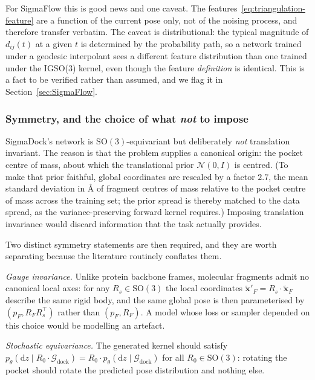 \documentclass[a4paper,12pt]{article}
\theoremstyle{remark}
\begin{document}
For SigmaFlow this is good news and one caveat. The features~\eqref{eq:triangulation-feature} are a
function of the current pose only, not of the noising process, and therefore transfer verbatim.
The caveat is distributional: the typical magnitude of $d_{ij}(t)$ at a given $t$ is determined by
the probability path, so a network trained under a geodesic interpolant sees a different feature
distribution than one trained under the IGSO(3) kernel, even though the feature \emph{definition}
is identical. This is a fact to be verified rather than assumed, and we flag it in
Section~\ref{sec:SigmaFlow}.

\subsubsection{Symmetry, and the choice of what \emph{not} to impose}

SigmaDock's network is $\mathrm{SO}(3)$-equivariant but deliberately \emph{not} translation
invariant. The reason is that the problem supplies a canonical origin: the pocket centre of mass,
about which the translational prior $\mathcal{N}(0, I)$ is centred. (To make that prior faithful,
global coordinates are rescaled by a factor $2.7$, the mean standard deviation in \AA{} of fragment
centres of mass relative to the pocket centre of mass across the training set; the prior spread is
thereby matched to the data spread, as the variance-preserving forward kernel requires.) Imposing
translation invariance would discard information that the task actually provides.

Two distinct symmetry statements are then required, and they are worth separating because the
literature routinely conflates them.

\emph{Gauge invariance.} Unlike protein backbone frames, molecular fragments admit no canonical
local axes: for any $R_s \in \mathrm{SO}(3)$ the local coordinates
$\tilde{\mathbf{x}}'_F = R_s \cdot \tilde{\mathbf{x}}_F$ describe the same rigid body, and the same
global pose is then parameterised by $(p_F, R_F R_s^{\top})$ rather than $(p_F, R_F)$. A model whose
loss or sampler depended on this choice would be modelling an artefact.

\emph{Stochastic equivariance.} The generated kernel should satisfy
$p_\theta(\mathrm{d}z \mid R_0 \cdot \mathcal{G}_{\text{dock}}) = R_0 \cdot p_\theta(\mathrm{d}z \mid \mathcal{G}_{\text{dock}})$
for all $R_0 \in \mathrm{SO}(3)$: rotating the pocket should rotate the predicted pose distribution
and nothing else.
\end{document}
